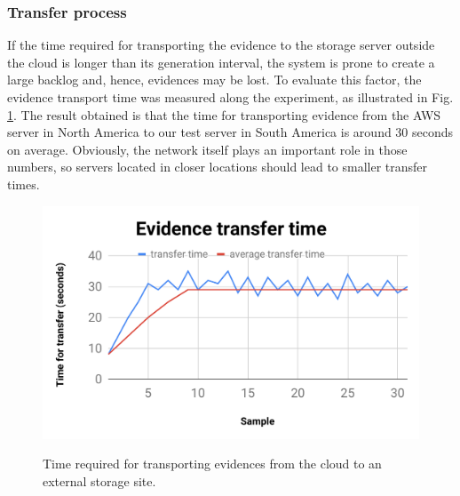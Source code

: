 \documentclass[10pt,journal,compsoc]{IEEEtran}
\newcommand{\marcos}[1]{{\color{green}{MARCOS: #1}}}
\begin{document}
\subsubsection{Transfer process}
If the time required for transporting the evidence to the storage server outside the cloud is longer than its generation interval, the system is prone to create a large backlog and, hence, evidences may be lost.
%
%
To evaluate this factor, the evidence transport time was measured along the experiment, as illustrated in Fig. \ref{fig:evidencia_transporte}.
%
The result obtained is that the time for transporting evidence from the AWS server in North America to our test server in South America is around 30 seconds on average.
%
Obviously, the network itself plays an important role in those numbers, so servers located in closer locations should lead to smaller transfer times.
%
%
%
%
%

\begin{figure}[htb!]
\footnotesize
\caption{Time required for transporting evidences from the cloud to an external storage site.
}
\includegraphics[center,scale=0.45]{evidencia_download_ieee.pdf}
\centering
\label{fig:evidencia_transporte}
\end{figure}
\end{document}

